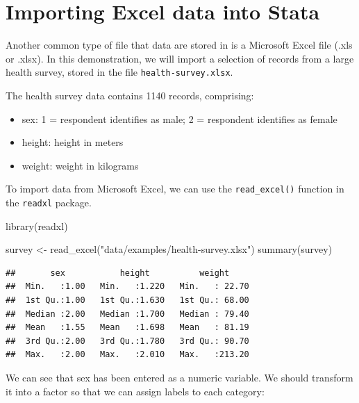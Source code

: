 \documentclass[
]{memoir}
\newenvironment{Shaded}{\begin{snugshade}}{\end{snugshade}}
\newcommand{\AttributeTok}[1]{\textcolor[rgb]{0.77,0.63,0.00}{#1}}
\newcommand{\DecValTok}[1]{\textcolor[rgb]{0.00,0.00,0.81}{#1}}
\newcommand{\FunctionTok}[1]{\textcolor[rgb]{0.00,0.00,0.00}{#1}}
\newcommand{\NormalTok}[1]{#1}
\newcommand{\OtherTok}[1]{\textcolor[rgb]{0.56,0.35,0.01}{#1}}
\newcommand{\SpecialCharTok}[1]{\textcolor[rgb]{0.00,0.00,0.00}{#1}}
\newcommand{\StringTok}[1]{\textcolor[rgb]{0.31,0.60,0.02}{#1}}
\providecommand{\tightlist}{%
  \setlength{\itemsep}{0pt}\setlength{\parskip}{0pt}}
\begin{document}
\hypertarget{import-excel}{%
\section{Importing Excel data into Stata}\label{import-excel}}

Another common type of file that data are stored in is a Microsoft Excel file (.xls or .xlsx). In this demonstration, we will import a selection of records from a large health survey, stored in the file \texttt{health-survey.xlsx}.

The health survey data contains 1140 records, comprising:

\begin{itemize}
\tightlist
\item
  sex: 1 = respondent identifies as male; 2 = respondent identifies as female
\item
  height: height in meters
\item
  weight: weight in kilograms
\end{itemize}

To import data from Microsoft Excel, we can use the \texttt{read\_excel()} function in the \texttt{readxl} package.

\begin{Shaded}
\begin{Highlighting}[]
\FunctionTok{library}\NormalTok{(readxl)}

\NormalTok{survey }\OtherTok{\textless{}{-}} \FunctionTok{read\_excel}\NormalTok{(}\StringTok{"data/examples/health{-}survey.xlsx"}\NormalTok{)}
\FunctionTok{summary}\NormalTok{(survey)}
\end{Highlighting}
\end{Shaded}

\begin{verbatim}
##       sex           height          weight      
##  Min.   :1.00   Min.   :1.220   Min.   : 22.70  
##  1st Qu.:1.00   1st Qu.:1.630   1st Qu.: 68.00  
##  Median :2.00   Median :1.700   Median : 79.40  
##  Mean   :1.55   Mean   :1.698   Mean   : 81.19  
##  3rd Qu.:2.00   3rd Qu.:1.780   3rd Qu.: 90.70  
##  Max.   :2.00   Max.   :2.010   Max.   :213.20
\end{verbatim}

We can see that sex has been entered as a numeric variable. We should transform it into a factor so that we can assign labels to each category:

\begin{Shaded}
\end{Shaded}
\end{document}
